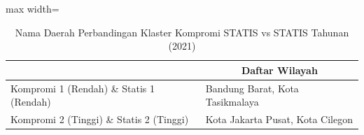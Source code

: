 \begin{table}[H]
\centering
\caption{Nama Daerah Perbandingan Klaster Kompromi STATIS vs STATIS Tahunan (2021)} \label{tab:sample1comp_statis_name_2021}
\begin{adjustbox}{max width=\textwidth}
\begin{tabular}{|>{\centering\arraybackslash}p{4cm}|p{10cm}|}
\hline
\multicolumn{1}{|c|}{\textbf{Kategori}} & \multicolumn{1}{c|}{\textbf{Daftar Wilayah}} \\
\hline
Kompromi 1 (Rendah) \& Statis 1 (Rendah) & Bandung Barat, Kota Tasikmalaya \\
\hline
Kompromi 2 (Tinggi) \& Statis 2 (Tinggi) & Kota Jakarta Pusat, Kota Cilegon \\
\hline
\end{tabular}
\end{adjustbox}
\end{table}